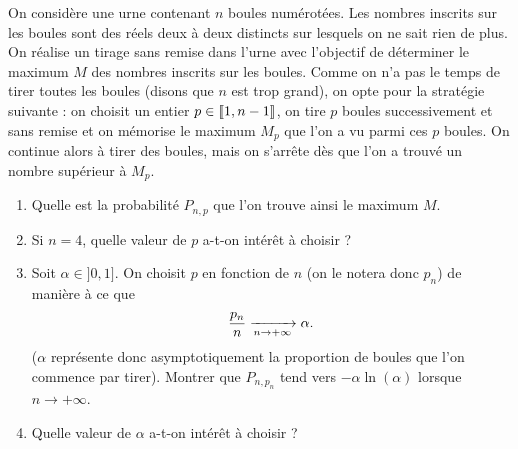 \documentclass{magnolia}
\begin{document}
On considère une urne contenant $n$ boules numérotées. Les nombres inscrits sur les boules sont des réels deux à deux distincts sur lesquels on ne sait rien de plus.
On réalise un tirage sans remise dans l'urne avec l'objectif de déterminer le maximum $M$ des nombres inscrits sur les boules.
Comme on n'a pas le temps de tirer toutes les boules (disons que $n$ est trop grand), on opte pour la stratégie suivante : on choisit un entier $p \in \left\llbracket 1,n-1\right\rrbracket$, on tire $p$ boules successivement et sans remise et on mémorise le maximum $M_p$ que l'on a vu parmi ces $p$ boules. On continue alors à tirer des boules, mais on s'arrête dès que l'on a trouvé un nombre supérieur à $M_p$. 
\begin{enumerate}
\item Quelle est la probabilité $P_{n,p}$ que l'on trouve ainsi le maximum $M$.
\item Si $n=4$, quelle valeur de $p$ a-t-on intérêt à choisir ?
\item Soit $\alpha \in ]0,1]$. On choisit $p$ en fonction de $n$ (on le notera donc $p_n$) de manière à ce que 
\[\frac{p_n}{n} \xrightarrow[n\rightarrow +\infty]{} \alpha.\] ($\alpha$ représente donc asymptotiquement la proportion de boules que l'on commence par tirer).
Montrer que $P_{n,p_n}$ tend vers $-\alpha \ln(\alpha)$ lorsque $n \to + \infty$.
\item Quelle valeur de $\alpha$ a-t-on intérêt à choisir ?
\end{enumerate}
\end{document}
